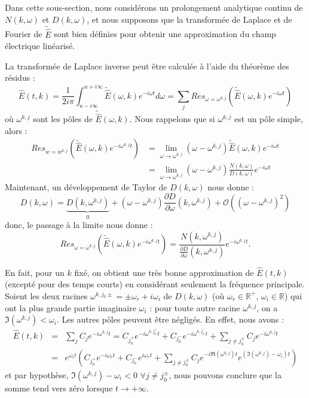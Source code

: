 Dans cette sous-section, nous considérons un prolongement analytique continu de $N(k,\omega)$ et $D(k,\omega)$, et nous supposons que la transformée de Laplace et de Fourier de $\tilde{\hat{E}}$ sont bien définies pour obtenir une approximation du champ électrique linéarisé.

La transformée de Laplace inverse peut être calculée à l'aide du théorème des résidus :
$$
  \hat{E}(t,k)=\frac{1}{2i\pi}\int_{u-i\infty}^{u+i\infty}\tilde{\hat{E}}(\omega,k)e^{-i\omega t}d\omega=\sum_jRes_{\omega=\omega^{k,j}}\left(\tilde{\hat{E}}(\omega,k)e^{-i\omega t}\right)
$$
où $\omega^{k,j}$ sont les pôles de $\tilde{\hat{E}}(\omega,k)$. Nous rappelons que si $\omega^{k,j}$ est un pôle simple, alors :
$$
  \begin{aligned}
    Res_{w=w^{k,j}}\left( \tilde{\hat{E}}(\omega,k)e^{-i\omega^{k,j}t} \right)
      & = \lim_{\omega\to\omega^{k,j}}\left( \omega - \omega^{k,j} \right)\tilde{\hat{E}}(\omega,k)e^{-i\omega t} \\
      & = \lim_{\omega\to\omega^{k,j}}\left( \omega - \omega^{k,j} \right)\frac{N(k,\omega)}{D(k,\omega)}e^{-i\omega t}
  \end{aligned}
$$
Maintenant, un développement de Taylor de $D(k,\omega)$ nous donne :
$$
  D(k,\omega) = \underbrace{D(k,\omega^{k,j})}_{0} + \left( \omega - \omega^{k,j} \right)\frac{\partial D}{\partial \omega}(k,\omega^{k,j}) + \mathcal{O}\left( (\omega-\omega^{k,j})^2 \right)
$$
donc, le passage à la limite nous donne :
\begin{equation}
  Res_{\omega=\omega^{k,j}}\left(\tilde{\hat{E}}(\omega,k)e^{-i\omega^{k,j}t}\right)=\frac{N(k,\omega^{k,j})}{\frac{\partial D}{\partial \omega}(k,\omega^{k,j})}e^{-i\omega^{k,j} t}.
  \label{eq:residu}
\end{equation}

\begin{remark}
  En fait, pour un $k$ fixé, on obtient une très bonne approximation de $\hat{E}(t,k)$ (excepté pour des temps courts) en considérant seulement la fréquence principale. Soient les deux racines $\omega^{k,j_0\pm}=\pm\omega_r+i\omega_i$ de $D(k,\omega)$ (où $\omega_r\in\mathbb{R}^+$, $\omega_i\in\mathbb{R}$) qui ont la plus grande partie imaginaire $\omega_i$ : pour toute autre racine $\omega^{k,j}$, on a $\Im(\omega^{k,j})<\omega_i$. Les autres pôles peuvent être négligés. En effet, nous avons :
  $$
    \begin{aligned}
       \hat{E}(t,k)&=&\sum_jC_je^{-i\omega^{k,j} t}=C_{j_0^+}e^{-i\omega^{k,j_0^+}t}+C_{j_0^-}e^{-i\omega^{k,j_0^-}t}+\sum_{j\neq j_0^\pm}C_je^{-i\omega^{k,j} t}\\
 &=&e^{\omega_it}\left(C_{j_0^+}e^{-i\omega_rt}+C_{j_0^-}e^{i\omega_rt}+\sum_{j\neq j_0^\pm}C_je^{-i\Re(\omega^{k,j}) t}e^{(\Im(\omega^{k,j})-\omega_i)t}\right)
    \end{aligned}
  $$
  et par hypothèse, $\Im(\omega^{k,j})-\omega_i < 0$ $\forall j\neq j_0^\pm$, nous pouvons conclure que la somme tend vers zéro lorsque $t\to+\infty$.
\end{remark}

